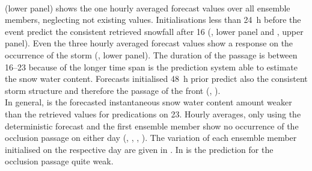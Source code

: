 \\
 (lower panel) shows the one hourly averaged forecast values over all ensemble members, neglecting not existing values. Initialisations less than \SI{24}{\hour} before the event predict the consistent retrieved snowfall after \SI{16}{\UTC} (, lower panel and , upper panel). Even the three hourly averaged forecast values show a response on the occurrence of the storm (, lower panel). 
The duration of the passage is between \SIrange{16}{23}{\UTC} because of the longer time span is the prediction system able to estimate the snow water content. Forecasts initialised \SI{48}{\hour} prior predict also the consistent storm structure and therefore the passage of the front (, ). 
\\
In general, is the forecasted instantaneous snow water content amount weaker than the retrieved values for predications on \SI{23}{\dec}. Hourly averages, only using the deterministic forecast and the first ensemble member show no occurrence of the occlusion passage on either day (, , , ). The variation of each ensemble member initialised on the respective day are given in . In  is the prediction for the occlusion passage quite weak. 
